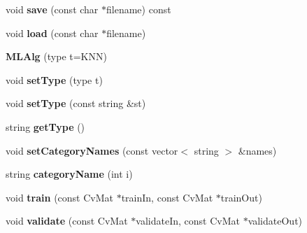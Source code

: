 \begin{DoxyCompactItemize}
\item 
\hypertarget{class_m_l_alg_a368d08fe8e04e626e56bd17d531ef795}{void {\bfseries save} (const char $\ast$filename) const }\label{class_m_l_alg_a368d08fe8e04e626e56bd17d531ef795}

\item 
\hypertarget{class_m_l_alg_a3651488762f2ba0d7f28e9ee114674bf}{void {\bfseries load} (const char $\ast$filename)}\label{class_m_l_alg_a3651488762f2ba0d7f28e9ee114674bf}

\item 
\hypertarget{class_m_l_alg_abe64a2a987f3564d4b8a555bc028a628}{{\bfseries M\-L\-Alg} (type t=K\-N\-N)}\label{class_m_l_alg_abe64a2a987f3564d4b8a555bc028a628}

\item 
\hypertarget{class_m_l_alg_ad91e8880931c1c1a4cffd06dd9abfbe7}{void {\bfseries set\-Type} (type t)}\label{class_m_l_alg_ad91e8880931c1c1a4cffd06dd9abfbe7}

\item 
\hypertarget{class_m_l_alg_a9189e74165b45c44b404660a67bdbfe8}{void {\bfseries set\-Type} (const string \&st)}\label{class_m_l_alg_a9189e74165b45c44b404660a67bdbfe8}

\item 
\hypertarget{class_m_l_alg_a7cc0abdf363c12ec83ee63119b81d19c}{string {\bfseries get\-Type} ()}\label{class_m_l_alg_a7cc0abdf363c12ec83ee63119b81d19c}

\item 
\hypertarget{class_m_l_alg_a44f120e39108980863a3fac855f89106}{void {\bfseries set\-Category\-Names} (const vector$<$ string $>$ \&names)}\label{class_m_l_alg_a44f120e39108980863a3fac855f89106}

\item 
\hypertarget{class_m_l_alg_ad62d73beb4bd63465a4bf24644df420f}{string {\bfseries category\-Name} (int i)}\label{class_m_l_alg_ad62d73beb4bd63465a4bf24644df420f}

\item 
\hypertarget{class_m_l_alg_af50750d469efca6635f056471423c619}{void {\bfseries train} (const Cv\-Mat $\ast$train\-In, const Cv\-Mat $\ast$train\-Out)}\label{class_m_l_alg_af50750d469efca6635f056471423c619}

\item 
\hypertarget{class_m_l_alg_af7cd4f07c40c55a603e3a6dcaf5f287d}{void {\bfseries validate} (const Cv\-Mat $\ast$validate\-In, const Cv\-Mat $\ast$validate\-Out)}\label{class_m_l_alg_af7cd4f07c40c55a603e3a6dcaf5f287d}


\end{DoxyCompactItemize}

